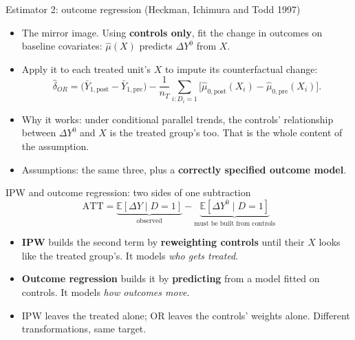 \documentclass[
  11pt,
  ignorenonframetext,
  aspectratio=169,
]{beamer}
\providecommand{\tightlist}{%
  \setlength{\itemsep}{0pt}\setlength{\parskip}{0pt}}
\begin{document}
\begin{frame}{Estimator 2: outcome regression (Heckman, Ichimura and
Todd 1997)}
\protect{}\label{estimator-2-outcome-regression-heckman-ichimura-and-todd-1997}
\begin{itemize}
\tightlist
\item
  The mirror image. Using \textbf{controls only}, fit the change in
  outcomes on baseline covariates: \(\hat\mu(X)\) predicts
  \(\Delta Y^0\) from \(X\).
\item
  Apply it to each treated unit's \(X\) to impute its counterfactual
  change: \[
  \hat\delta_{OR} = \big(\bar Y_{1,\text{post}} - \bar Y_{1,\text{pre}}\big) - \frac{1}{n_T}\sum_{i: D_i = 1}\big[\hat\mu_{0,\text{post}}(X_i) - \hat\mu_{0,\text{pre}}(X_i)\big].
  \]
\item
  Why it works: under conditional parallel trends, the controls'
  relationship between \(\Delta Y^0\) and \(X\) is the treated group's
  too. That is the whole content of the assumption.
\item
  Assumptions: the same three, plus a \textbf{correctly specified
  outcome model}.
\end{itemize}
\end{frame}

\begin{frame}{IPW and outcome regression: two sides of one subtraction}
\protect{}\label{ipw-and-outcome-regression-two-sides-of-one-subtraction}
\[
\text{ATT} = \underbrace{\mathbb{E}[\Delta Y \mid D=1]}_{\text{observed}} - \underbrace{\mathbb{E}[\Delta Y^0 \mid D=1]}_{\text{must be built from controls}}
\]

\begin{itemize}
\tightlist
\item
  \textbf{IPW} builds the second term by \textbf{reweighting controls}
  until their \(X\) looks like the treated group's. It models \emph{who
  gets treated}.
\item
  \textbf{Outcome regression} builds it by \textbf{predicting} from a
  model fitted on controls. It models \emph{how outcomes move}.
\item
  IPW leaves the treated alone; OR leaves the controls' weights alone.
  Different transformations, same target.
\end{itemize}
\end{frame}
\end{document}
